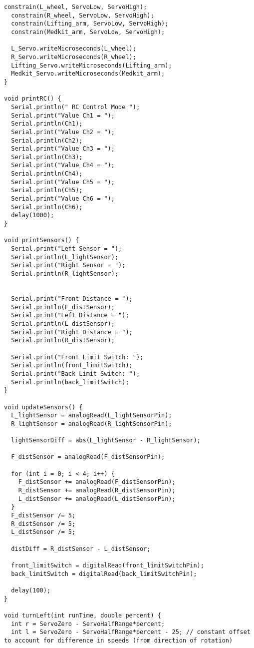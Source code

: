 \begin{lstlisting}[style=myArduino]
  constrain(L_wheel, ServoLow, ServoHigh);
  constrain(R_wheel, ServoLow, ServoHigh);
  constrain(Lifting_arm, ServoLow, ServoHigh);
  constrain(Medkit_arm, ServoLow, ServoHigh);

  L_Servo.writeMicroseconds(L_wheel);
  R_Servo.writeMicroseconds(R_wheel);
  Lifting_Servo.writeMicroseconds(Lifting_arm);
  Medkit_Servo.writeMicroseconds(Medkit_arm);
}

void printRC() {
  Serial.println(" RC Control Mode ");
  Serial.print("Value Ch1 = ");
  Serial.println(Ch1);
  Serial.print("Value Ch2 = ");
  Serial.println(Ch2);
  Serial.print("Value Ch3 = ");
  Serial.println(Ch3);
  Serial.print("Value Ch4 = ");
  Serial.println(Ch4);
  Serial.print("Value Ch5 = ");
  Serial.println(Ch5);
  Serial.print("Value Ch6 = ");
  Serial.println(Ch6);
  delay(1000);
}

void printSensors() {
  Serial.print("Left Sensor = ");
  Serial.println(L_lightSensor);
  Serial.print("Right Sensor = ");
  Serial.println(R_lightSensor);


  Serial.print("Front Distance = ");
  Serial.println(F_distSensor);
  Serial.print("Left Distance = ");
  Serial.println(L_distSensor);
  Serial.print("Right Distance = ");
  Serial.println(R_distSensor);

  Serial.print("Front Limit Switch: ");
  Serial.println(front_limitSwitch);
  Serial.print("Back Limit Switch: ");
  Serial.println(back_limitSwitch);
}

void updateSensors() {
  L_lightSensor = analogRead(L_lightSensorPin);
  R_lightSensor = analogRead(R_lightSensorPin);

  lightSensorDiff = abs(L_lightSensor - R_lightSensor);

  F_distSensor = analogRead(F_distSensorPin);

  for (int i = 0; i < 4; i++) {
    F_distSensor += analogRead(F_distSensorPin);
    R_distSensor += analogRead(R_distSensorPin);
    L_distSensor += analogRead(L_distSensorPin);
  }
  F_distSensor /= 5;
  R_distSensor /= 5;
  L_distSensor /= 5;

  distDiff = R_distSensor - L_distSensor;

  front_limitSwitch = digitalRead(front_limitSwitchPin);
  back_limitSwitch = digitalRead(back_limitSwitchPin);
  
  delay(100);
}

void turnLeft(int runTime, double percent) {
  int r = ServoZero - ServoHalfRange*percent;
  int l = ServoZero - ServoHalfRange*percent - 25; // constant offset to account for difference in speeds (from direction of rotation)


\end{lstlisting}
